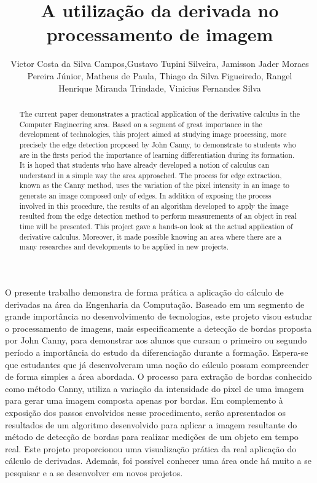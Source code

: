 \documentclass[12pt]{article}
\title{A utilização da derivada no processamento de imagem}
\author{Victor Costa da Silva Campos\inst{2},Gustavo Tupini Silveira\inst{1}, Jamisson Jader Moraes\\ Pereira Júnior\inst{1}, Matheus de Paula\inst{1}, Thiago da Silva Figueiredo, Rangel\\ Henrique Miranda Trindade\inst{1}, Vinicius Fernandes Silva\inst{1} }
\begin{document}
 
	
	\maketitle
	
	\begin{abstract}
		The current paper demonstrates a practical application of the derivative calculus in the Computer Engineering area. Based on a segment of great importance in the development of technologies, this project aimed at studying image processing, more precisely the edge detection proposed by John Canny, to demonstrate to students who are in the firsts period the importance of learning differentiation during its formation. It is hoped that students who have already developed a notion of calculus can understand in a simple way the area approached. The process for edge extraction, known as the Canny method, uses the variation of the pixel intensity in an image to generate an image composed only of edges. In addition of exposing the process involved in this procedure, the results of an algorithm developed to apply the image resulted from the edge detection method to perform measurements of an object in real time will be presented. This project gave a hands-on look at the actual application of derivative calculus. Moreover, it made possible knowing an area where there are a many researches and developments to be applied in new projects.
	\end{abstract}
	
	\begin{resumo} 
		O presente trabalho demonstra de forma prática a aplicação do cálculo de derivadas na área da Engenharia da Computação. Baseado em um segmento de grande importância no desenvolvimento de tecnologias, este projeto visou estudar o processamento de imagens, mais especificamente a detecção de bordas proposta por John Canny, para demonstrar aos alunos que cursam o primeiro ou segundo período a importância do estudo da diferenciação durante a formação. Espera-se que estudantes que já desenvolveram uma noção do cálculo possam compreender de forma simples a área abordada. O processo para extração de bordas conhecido como método Canny, utiliza a variação da intensidade do pixel de uma imagem para gerar uma imagem composta apenas por bordas. Em complemento à exposição dos passos envolvidos nesse procedimento, serão apresentados os resultados de um algoritmo desenvolvido para aplicar a imagem resultante do método de detecção de bordas para realizar medições de um objeto em tempo real. Este projeto proporcionou uma visualização prática da real aplicação do cálculo de derivadas. Ademais, foi possível conhecer uma área onde há muito a se pesquisar e a se desenvolver em novos projetos. 
	\end{resumo}
	
\end{document}
